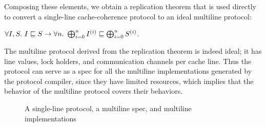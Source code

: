 \documentclass[sigplan,10pt,review,anonymous,screen]{acmart}\settopmatter{printfolios=true,printccs=false,printacmref=false}
\begin{document}
Composing these elements, we obtain a replication theorem that is used directly to convert a single-line cache-coherence protocol to an ideal multiline protocol:
\begin{theorem}[Replication]
  $\forall I, S.\ I \sqsubseteq S \to \forall n.\ \bigoplus^{n}_{i=0} I^{(i)} \sqsubseteq \bigoplus^{n}_{i=0} S^{(i)}$.
  \label{thm-replication}
\end{theorem}

The multiline protocol derived from the replication theorem is indeed ideal; it has line values, lock holders, and communication channels per cache line.
Thus the protocol can serve as a spec for all the multiline implementations generated by the protocol compiler, since they have limited resources, which implies that the behavior of the multiline protocol covers their behaviors.

\begin{figure}[h]
  \centering
  \caption{A single-line protocol, a multiline spec, and multiline implementations}
  \label{fig-multiline-spec}
\end{figure}
\end{document}

